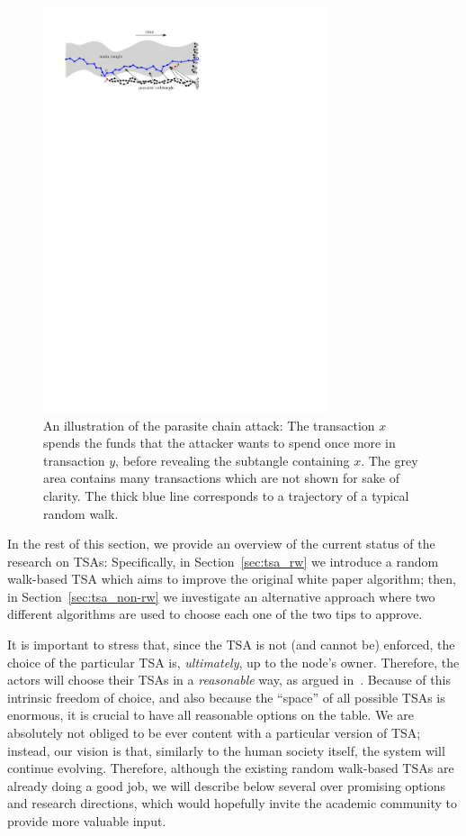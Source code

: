 \documentclass[../main.tex]{subfiles}
\begin{document}
\begin{figure}[htb]
     \centering
     \includegraphics[width=0.75\textwidth]{images/par_attack.pdf}
     \caption{An illustration of the parasite chain attack: The transaction $x$ spends the funds that the attacker wants to spend once more in transaction $y$, before revealing the subtangle containing $x$. The grey area contains many transactions which are not shown for sake of clarity. The thick blue line corresponds to a trajectory of a typical random walk.}
     \label{fig:parasite_chain}
\end{figure}

In the rest of this section, we provide an overview of the current status of the research on TSAs:
Specifically, in Section~\ref{sec:tsa_rw} we introduce a random walk-based TSA which aims to improve the original white paper algorithm;
then, in Section~\ref{sec:tsa_non-rw} we investigate an alternative approach where two different algorithms are used to choose each one of the two tips to approve.

It is important to stress that, since the TSA is not (and cannot be) enforced, the choice of the particular TSA is, \emph{ultimately}, up to the node's owner. Therefore, the actors will choose their TSAs in a \emph{reasonable} way, as argued in~\cite{popov2019feelessfree}.  Because of this intrinsic freedom of choice, and also because the ``space'' of all possible TSAs is enormous, it is crucial to have all reasonable options on the table. We are absolutely not obliged to be ever content with a particular version of TSA; instead, our vision is that, similarly to the human society itself, the system will continue evolving. Therefore, although the existing random walk-based TSAs are already doing a good job, we will describe below several over promising  options and research directions, which would hopefully invite the academic community to provide more valuable input.
\end{document}
